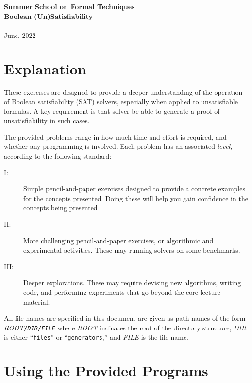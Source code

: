 
\usepackage[pdftex]{graphicx}


\usepackage{exercise}
\usepackage{enumitem}
\usepackage{color}
\usepackage{booktabs}

\newcommand{\pathname}[2]{\textit{ROOT}\texttt{/}\texttt{#1}\texttt{/}\texttt{#2}}


\begin{center}
{\LARGE\bf Summer School on Formal Techniques\\ [1.5 ex]
Boolean (Un)Satisfiability \\[2ex]
}\\ [2 ex]
June, 2022
\end{center}
\section*{Explanation}

These exercises are designed to provide a deeper understanding of the
operation of Boolean satisfiability (SAT) solvers, especially when
applied to unsatisfiable formulas.  A key requirement is that solver
be able to generate a proof of unsatisfiability in such cases.

The provided problems range in how much time and effort is required,
and whether any programming is involved.  Each problem has an
associated {\em level}, according to the following standard:
\begin{description}
\item[I:] Simple pencil-and-paper exercises designed to provide a
  concrete examples for the concepts presented.  Doing these will
  help you gain confidence in the concepts being presented
\item[II:] More challenging pencil-and-paper exercises, or algorithmic
  and experimental activities.  These may running solvers on some
  benchmarks.
\item[III:] Deeper explorations.  These may require devising new
  algorithms, writing code, and performing experiments that go beyond
  the core lecture material.
\end{description}

All file names are specified in this document are given as path names
of the form
\pathname{\textit{DIR}}{\textit{FILE}}
where
\textit{ROOT} indicates the root of the directory structure,
\textit{DIR} is either ``\texttt{files}'' or ``\texttt{generators},''
and \textit{FILE} is the file name.


\newpage

\section*{Using the Provided Programs}

